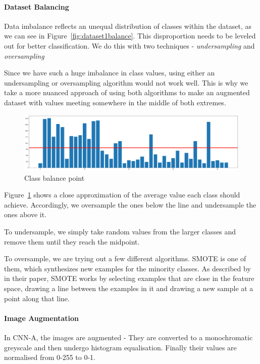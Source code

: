 \documentclass[12pt, landscape]{article}
\begin{document}
\begin{multicols}{3}
\paragraph{Dataset Balancing}
Data imbalance reflects an unequal distribution of classes within the dataset,
as we can see in Figure~\ref{fig:dataset1balance}. This disproportion needs to
be leveled out for better classification. We do this with two techniques -
\emph{undersampling} and \emph{oversampling}

Since we have such a huge imbalance in class values, using either an
undersampling or oversampling algorithm would not work well. This is why we take
a more nuanced approach of using both algorithms to make an augmented dataset
with values meeting somewhere in the middle of both extremes.
\begin{figure}[H]
    \centerline{\includegraphics[scale = 0.2]{classbalance.png}}
    \caption{Class balance point}
    \label{fig:dataset1balancemid}
\end{figure}
Figure~\ref{fig:dataset1balancemid} shows a close approximation of the average value
each class should achieve. Accordingly, we oversample the ones below the line
and undersample the ones above it.

To undersample, we simply take random values from the larger classes and remove
them until they reach the midpoint.

To oversample, we are trying out a few different algorithms. SMOTE is one of
them, which synthesizes new examples for the minority classes. As described by
\citep[Nitesh Chawla et al]{SMOTE} in their paper, SMOTE works by selecting
examples that are close in the feature space, drawing a line between the
examples in it and drawing a new sample at a point along that
line.


\paragraph{Image Augmentation}
In CNN-A, the images are augmented - They are converted to a
monochromatic greyscale and then undergo histogram equalisation. Finally
their values are normalised from 0-255 to 0-1.


\end{multicols}
\end{document}
